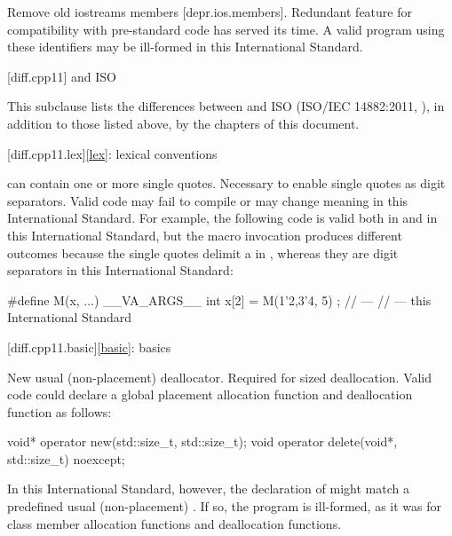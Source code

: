 \nodiffref
\change
Remove old iostreams members [depr.ios.members].
\rationale
Redundant feature for compatibility with pre-standard code
has served its time.
\effect
A valid \CppXIV{} program using these identifiers
may be ill-formed in this International Standard.

[diff.cpp11]{\Cpp{} and ISO \CppXI{}}

\pnum
{}%
This subclause lists the differences between \Cpp{} and
ISO \CppXI{} (ISO/IEC 14882:2011, ),
in addition to those listed above,
by the chapters of this document.

[diff.cpp11.lex]{\ref{lex}: lexical conventions}

\change
{} can contain one or more single quotes.
\rationale
Necessary to enable single quotes as digit separators.
\effect
Valid \CppXI{} code may fail to compile or may change meaning in this
International Standard. For example, the following code is valid both in \CppXI{} and in
this International Standard, but the macro invocation produces different outcomes
because the single quotes delimit a  in \CppXI{}, whereas they are digit
separators in this International Standard:

\begin{codeblock}
#define M(x, ...) __VA_ARGS__
int x[2] = { M(1'2,3'4, 5) };
//  --- \CppXI{}
//  --- this International Standard
\end{codeblock}

[diff.cpp11.basic]{\ref{basic}: basics}

\change
New usual (non-placement) deallocator.
\rationale
Required for sized deallocation.
\effect
Valid \CppXI{} code could declare a global placement allocation function and
deallocation function as follows:
\begin{codeblock}
void* operator new(std::size_t, std::size_t);
void operator delete(void*, std::size_t) noexcept;
\end{codeblock}

In this International Standard, however, the declaration of 
might match a predefined usual (non-placement)
. If so, the
program is ill-formed, as it was for class member allocation functions and
deallocation functions.


